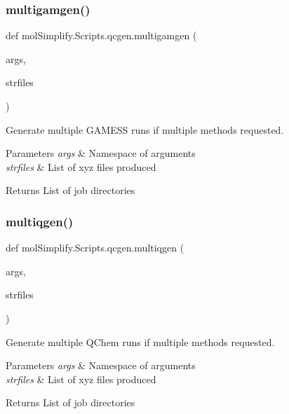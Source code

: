 \subsubsection{\texorpdfstring{multigamgen()}{multigamgen()}}
{\footnotesize\ttfamily def mol\+Simplify.\+Scripts.\+qcgen.\+multigamgen (\begin{DoxyParamCaption}\item[{}]{args,  }\item[{}]{strfiles }\end{DoxyParamCaption})}



Generate multiple G\+A\+M\+E\+SS runs if multiple methods requested. 


\begin{DoxyParams}{Parameters}
{\em args} & Namespace of arguments \\
\hline
{\em strfiles} & List of xyz files produced \\
\hline
\end{DoxyParams}
\begin{DoxyReturn}{Returns}
List of job directories 
\end{DoxyReturn}
\mbox{\label{namespacemolSimplify_1_1Scripts_1_1qcgen_a6b72e45f5e7b20a7cc8516c5cdfa49cc}} 
\subsubsection{\texorpdfstring{multiqgen()}{multiqgen()}}
{\footnotesize\ttfamily def mol\+Simplify.\+Scripts.\+qcgen.\+multiqgen (\begin{DoxyParamCaption}\item[{}]{args,  }\item[{}]{strfiles }\end{DoxyParamCaption})}



Generate multiple Q\+Chem runs if multiple methods requested. 


\begin{DoxyParams}{Parameters}
{\em args} & Namespace of arguments \\
\hline
{\em strfiles} & List of xyz files produced \\
\hline
\end{DoxyParams}
\begin{DoxyReturn}{Returns}
List of job directories 
\end{DoxyReturn}
\mbox{\label{namespacemolSimplify_1_1Scripts_1_1qcgen_a94d2464e1bb9c7d8af5d714a947d6994}} 
